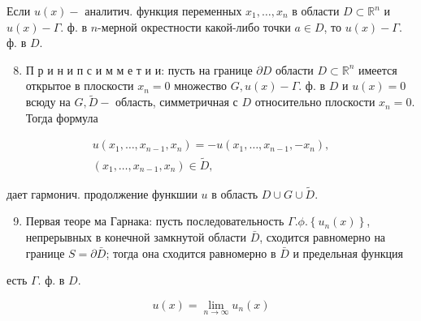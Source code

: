 \documentclass[10pt]{article}
\begin{document}
Если $u(x)-$ аналитич. функция переменных $x_{1}, \ldots, x_{n}$ в области $D \subset \mathbb{R}^{n}$ и $u(x)-\Gamma$. ф. в $n$-мерной окрестности какой-либо точки $a \in D$, то $u(x)-\Gamma$. ф. в $D$.



\begin{enumerate}

  \setcounter{enumi}{7}

  \item П р и н и п с и м м е т и и: пусть на границе $\partial D$ области $D \subset \mathbb{R}^{n}$ имеется открытое в плоскости $x_{n}=0$ множество $G, u(x)-\Gamma$. ф. в $D$ и $u(x)=0$ всюду на $G, \widetilde{D}-$ область, симметричная с $D$ относительно плоскости $x_{n}=0$. Тогда формула

\end{enumerate}



\[

\begin{gathered}

u\left(x_{1}, \ldots, x_{n-1}, x_{n}\right)=-u\left(x_{1}, \ldots, x_{n-1},-x_{n}\right), \\

\left(x_{1}, \ldots, x_{n-1}, x_{n}\right) \in \widetilde{D},

\end{gathered}

\]



дает гармонич. продолжение функшии $u$ в область $D \cup G \cup \tilde{D}$.



\begin{enumerate}

  \setcounter{enumi}{8}

  \item Первая теоре ма Гарнака: пусть последовательность $\Gamma . \phi .\left\{u_{n}(x)\right\}$, непрерывных в конечной замкнутой области $\bar{D}$, сходится равномерно на границе $S=\partial \bar{D}$; тогда она сходится равномерно в $\bar{D}$ и предельная функция

\end{enumerate}



есть $\Gamma$. ф. в $D$.



\[

u(x)=\lim _{n \rightarrow \infty} u_{n}(x)

\]
\end{document}
